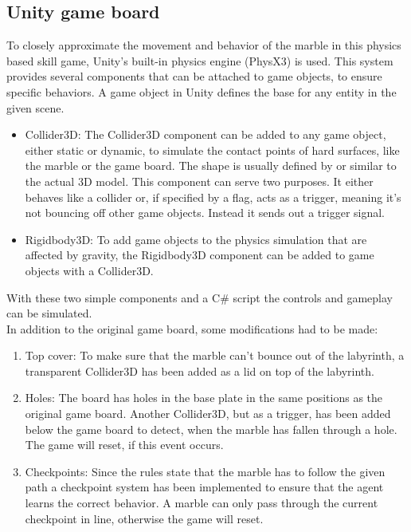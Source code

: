 \subsection{Unity game board}\label{subsec:unity-game-board}
To closely approximate the movement and behavior of the marble in this physics based skill game,
Unity's built-in physics engine (PhysX3) is used.
This system provides several components that can be attached to game objects, to ensure specific behaviors.
A game object in Unity defines the base for any entity in the given scene.
\begin{itemize}
    \item{Collider3D}: The Collider3D component can be added to any game object, either static or dynamic, to simulate the contact points of hard surfaces, like the marble or the game board.
    The shape is usually defined by or similar to the actual 3D model.
    This component can serve two purposes.
    It either behaves like a collider or, if specified by a flag, acts as a trigger, meaning it's not bouncing off other game objects.
    Instead it sends out a trigger signal.
    \item{Rigidbody3D}: To add game objects to the physics simulation that are affected by gravity, the Rigidbody3D component can be added to game objects with a Collider3D.
\end{itemize}
With these two simple components and a C\# script the controls and gameplay can be simulated.\\
In addition to the original game board, some modifications had to be made:
\begin{enumerate}
    \item{Top cover}: To make sure that the marble can't bounce out of the labyrinth, a transparent Collider3D has been
    added as a lid on top of the labyrinth.
    \item{Holes}: The board has holes in the base plate in the same positions as the original game board.
    Another Collider3D, but as a trigger, has been added below the game board to detect, when the marble has fallen through a hole.
    The game will reset, if this event occurs.
    \item{Checkpoints}: Since the rules state that the marble has to follow the given path a checkpoint system has been implemented to ensure that the agent learns the correct behavior.
    A marble can only pass through the current checkpoint in line, otherwise the game will reset.
\end{enumerate}